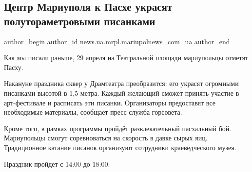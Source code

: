  
 
 
 
 
 
\subsection{Центр Мариуполя к Пасхе украсят полутораметровыми писанками}
\label{sec:22_04_2019.stz.news.ua.mrpl.mariupolnews_com_ua.1.centr_mariupolja_ukrasjat_k_pashe}
 
\ifcmt
 author_begin
   author_id news.ua.mrpl.mariupolnews_com_ua
 author_end
\fi


\href{http://mariupolnews.com.ua/news/view/master-klassy-roboty-i-ogromnye-pisanki-mariupoltsev-priglashayut-vmeste-otmetit-pashu}{Как
мы писали раньше}, 29 апреля на Театральной площади мариупольцы отметят Пасху.

Накануне праздника сквер у Драмтеатра преобразится: его украсят огромными
писанками высотой в 1,5 метра. Каждый желающий сможет принять участие в
арт-фестивале и расписать эти писанки. Организаторы предоставят все необходимые
материалы, сообщает пресс-служба горсовета.

Кроме того, в рамках программы пройдёт развлекательный пасхальный бой.
Мариупольцы смогут соревноваться на скорость в давке сырых яиц. Традиционное
катание писанок организуют сотрудники краеведческого музея.

Праздник пройдет с 14:00 до 18:00.
